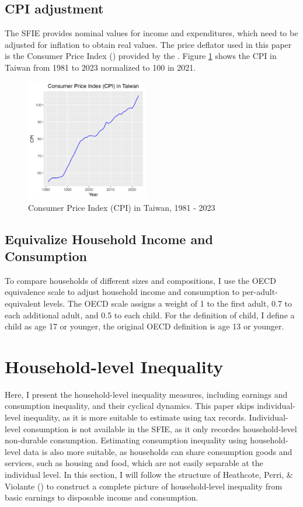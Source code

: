 \documentclass{article}
\begin{document}
\subsection{CPI adjustment}

The SFIE provides nominal values for income and expenditures, which need to be adjusted for inflation to obtain real values. 
The price deflator used in this paper is the Consumer Price Index () provided by the \citeauthor{DGBAS_CPI}.
Figure \ref{fig:CPI} shows the CPI in Taiwan from 1981 to 2023 normalized to 100 in 2021.
\begin{figure}
    \centering
    \includegraphics[width=0.475\textwidth]{figures/cpi.png}
    \caption{Consumer Price Index (CPI) in Taiwan, 1981 - 2023}
    \label{fig:CPI}
\end{figure}

\subsection{Equivalize Household Income and Consumption}

To compare households of different sizes and compositions, I use the OECD equivalence scale to adjust household income and consumption to per-adult-equivalent levels. The OECD scale assigns a weight of 1 to the first adult, 0.7 to each additional adult, and 0.5 to each child. For the definition of child, I define a child as age 17 or younger, the original OECD definition is age 13 or younger.

\section{Household-level Inequality}
\label{sec:household_inequality}

Here, I present the household-level inequality measures, including earnings and consumption inequality, and their cyclical dynamics. This paper skips individual-level inequality, as it is more suitable to estimate using tax records. Individual-level consumption is not available in the SFIE, as it only recordes household-level non-durable consumption.
Estimating consumption inequality using household-level data is also more suitable, as households can share consumption goods and services, such as housing and food, which are not easily separable at the individual level.
In this section, I will follow the structure of Heathcote, Perri, \& Violante (\citeyear{HEATHCOTE_2010}) to construct a complete picture of household-level inequality from basic earnings to disposable income and consumption. 
\end{document}

